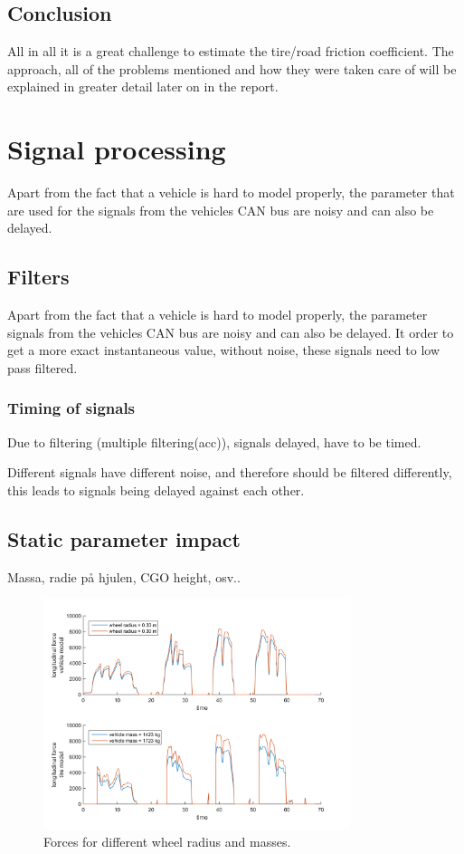 \subsection{Conclusion}
All in all it is a great challenge to estimate the tire/road friction coefficient.  The approach, all of the problems mentioned and how they were taken care of will be explained in greater detail later on in the report.

\section{Signal processing}

Apart from the fact that a vehicle is hard to model properly, the parameter that are used for the  signals from the vehicles CAN bus are noisy and can also be delayed.

\subsection{Filters}

Apart from the fact that a vehicle is hard to model properly, the parameter signals from the vehicles CAN bus are noisy and can also be delayed. It order to get a more exact instantaneous value, without noise, these signals need to low pass filtered. 


\subsubsection{Timing of signals}

Due to filtering (multiple filtering(acc)), signals delayed, have to be timed.

Different signals have different noise, and therefore should be filtered differently, this leads to signals being delayed against each other. 

\subsection{Static parameter impact}

Massa, radie på hjulen, CGO height, osv..

\begin{figure}[h]
	\centering
	\includegraphics[width=0.8\textwidth]{Pictures/force_diff_re_mass}
	\caption {Forces for different wheel radius and masses.}
	\label{force_diff_re_mass}
\end{figure}


